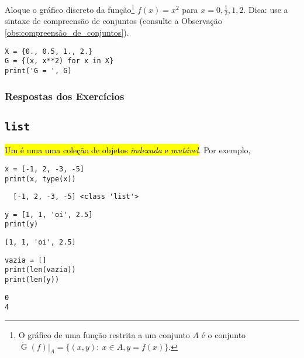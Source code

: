 \begin{exer}
  Aloque o gráfico discreto da função\footnote{O gráfico de uma função restrita a um conjunto $A$ é o conjunto $\operatorname{G}(f)|_{A} = \{(x,y):~x\in A, y=f(x)\}$.} $f(x) = x^2$ para $x=0, \frac{1}{2}, 1, 2$. Dica: use a sintaxe de compreensão de conjuntos (consulte a Observação \ref{obs:compreensão_de_conjuntos}).
\end{exer}

\begin{resp}

\begin{lstlisting}
X = {0., 0.5, 1., 2.}
G = {(x, x**2) for x in X}
print('G = ', G)
\end{lstlisting}

\end{resp}

\ifisbook 
\subsubsection*{Respostas dos Exercícios}
\shipoutAnswer
\fi


\subsection{\texttt{list}}

\hl{Um {\PYTHONlist} é uma uma coleção de objetos \emph{indexada} e \emph{mutável}}. Por exemplo,

\begin{lstlisting}
x = [-1, 2, -3, -5]
print(x, type(x))
\end{lstlisting}

\begin{verbatim}
  [-1, 2, -3, -5] <class 'list'>
\end{verbatim}

\begin{lstlisting}
y = [1, 1, 'oi', 2.5]
print(y)
\end{lstlisting}

\begin{verbatim}
[1, 1, 'oi', 2.5]
\end{verbatim}

\begin{lstlisting}
vazia = []
print(len(vazia))
print(len(y))
\end{lstlisting}

\begin{verbatim}
0
4
\end{verbatim}

